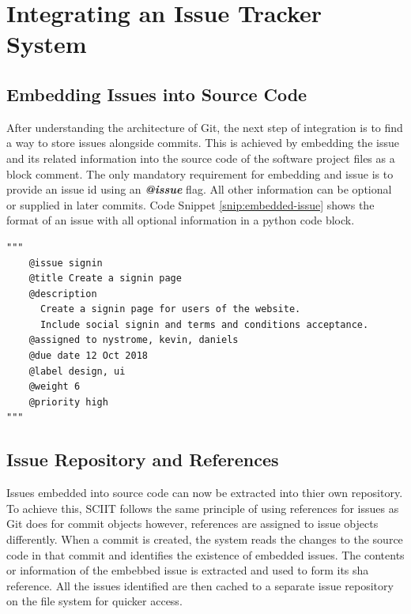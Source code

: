 \documentclass{mproj}
\newenvironment{code}{\captionsetup{type=listing}}{}
\begin{document}
\section{Integrating an Issue Tracker System}


\subsection{Embedding Issues into Source Code}

After understanding the architecture of Git, the next step of integration is to find a way to store issues alongside commits. This is achieved by embedding the issue and its related information into the source code of the software project files as a block comment. The only mandatory requirement for embedding and issue is to provide an issue id using an \textbf{\textit{@issue}} flag. All other information can be optional or supplied in later commits. Code Snippet \ref{snip:embedded-issue} shows the format of an issue with all optional information in a python code block.

\begin{code}
\label{snip:embedded-issue}
\begin{verbatim}
"""
    @issue signin
    @title Create a signin page
    @description
      Create a signin page for users of the website. 
      Include social signin and terms and conditions acceptance.
    @assigned to nystrome, kevin, daniels
    @due date 12 Oct 2018
    @label design, ui
    @weight 6
    @priority high    
"""
\end{verbatim}
\end{code}




\subsection{Issue Repository and References}

Issues embedded into source code can now be extracted into thier own repository. To achieve this, SCIIT follows the same principle of using references for issues as Git does for commit objects however, references are assigned to issue objects differently. When a commit is created, the system reads the changes to the source code in that commit and identifies the existence of embedded issues. The contents or information of the embebbed issue is extracted and used to form its sha reference. All the issues identified are then cached to a separate issue repository on the file system for quicker access. 
\end{document}
